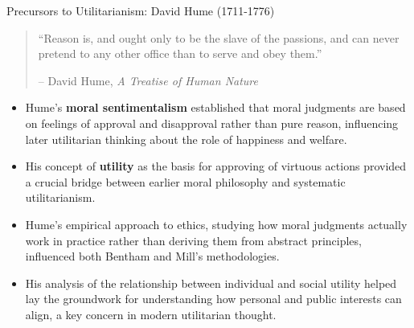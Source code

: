 \documentclass[aspectratio=169]{beamer}
\begin{document}
\begin{frame}{Precursors to Utilitarianism: David Hume (1711-1776)}
    \begin{quote}
        ``Reason is, and ought only to be the slave of the passions, and can never pretend to any other office than to serve and obey them.''
        \vspace{0.5em}
        
        -- David Hume, \textit{A Treatise of Human Nature}
    \end{quote}
    \begin{itemize}
        \item Hume's \textbf{moral sentimentalism} established that moral judgments are based on feelings of approval and disapproval rather than pure reason, influencing later utilitarian thinking about the role of happiness and welfare.
        
        \item His concept of \textbf{utility} as the basis for approving of virtuous actions provided a crucial bridge between earlier moral philosophy and systematic utilitarianism.
        
        \item Hume's empirical approach to ethics, studying how moral judgments actually work in practice rather than deriving them from abstract principles, influenced both Bentham and Mill's methodologies.
        
        \item His analysis of the relationship between individual and social utility helped lay the groundwork for understanding how personal and public interests can align, a key concern in modern utilitarian thought.

    \end{itemize}
\end{frame}
\end{document}
